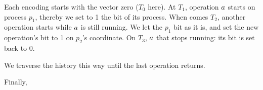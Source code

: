 \documentclass[12pt]{article}
\begin{document}
\begin{example}
\begin{figure}[H]
\begin{center}
{
}
\end{center}
\label{fig:encodingExample1AllVectors}
\end{figure}

Each encoding starts with the vector zero ($T_0$ here). At $T_1$, operation $a$ starts on process $p_1$, thereby we set to 1 the bit of its process. When comes $T_2$, another operation starts while $a$ is still running. We let the $p_1$ bit as it is, and set the new operation's bit to 1 on $p_2$'s coordinate. On $T_3$, $a$ that stops running: its bit is set back to 0. 

We traverse the history this way until the last operation returns.

Finally,


\end{example}
\end{document}
